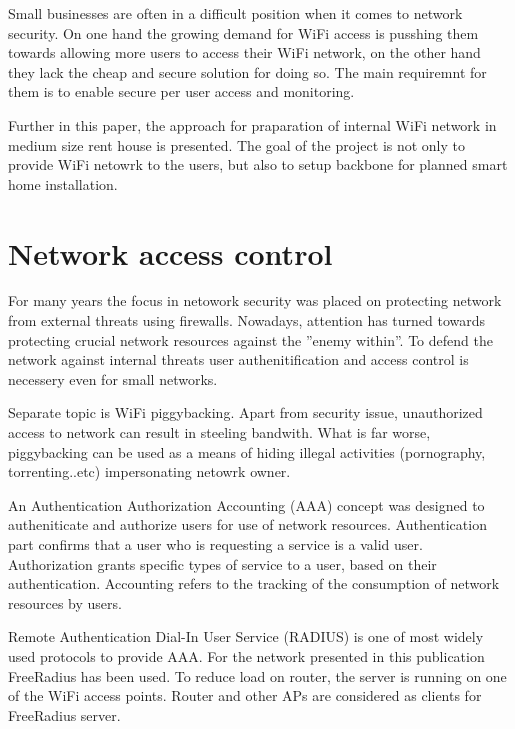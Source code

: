 \documentclass{llncs}
\begin{document}
Small businesses are often in a difficult position when it comes to network
security. On one hand the growing demand for WiFi access is pusshing them
towards allowing more users to access their WiFi network, on the other hand they
lack the cheap and secure solution for doing so. The main requiremnt for them is
to enable secure per user access and monitoring. 

Further in this paper, the approach for praparation of internal WiFi network in
medium size rent house is presented. The goal of the project is not only to
provide WiFi netowrk to the users, but also to setup backbone for planned
smart home installation.

\section{Network access control}
For many years the focus in netowork security was placed on protecting
network from external threats using firewalls. Nowadays, attention has turned
towards protecting crucial network resources against the ''enemy within''. To
defend the network against internal threats user authenitification and
access control is necessery even for small networks. 

Separate topic is WiFi piggybacking. Apart from security issue,
unauthorized access to network can result in steeling bandwith. What is far
worse, piggybacking can be used as a means of hiding illegal activities
(pornography, torrenting..etc) impersonating netowrk owner.

An Authentication Authorization Accounting (AAA) \cite{rfc2903}\cite{rfc2904}
concept was designed to autheniticate and authorize users for use of network
resources. Authentication part confirms that a user who is requesting a service
is a valid user. Authorization grants specific types of service to a user, based
on their authentication. Accounting refers to the tracking of the consumption of
network resources by users.

Remote Authentication Dial-In User Service (RADIUS) \cite{rfc2865} is one of
most widely used protocols to provide AAA. For the network presented in this
publication FreeRadius \cite{freeRadius} has been used. To reduce load on
router, the server is running on one of the WiFi access points. Router and other
APs are considered as clients for FreeRadius server.
\end{document}
